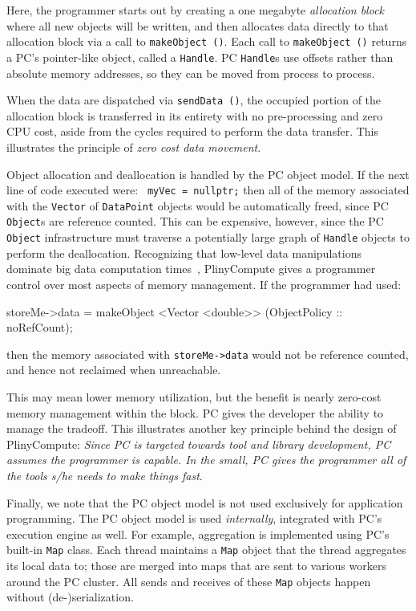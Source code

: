\noindent
Here, the programmer starts out by creating a one megabyte \emph{allocation block} where all new objects will be written,
and then allocates data directly to that allocation block via a call to \texttt{makeObject ()}.  Each call to  \texttt{makeObject ()}
returns a PC's pointer-like object, called a \texttt{Handle}.  PC \texttt{Handle}s use offsets rather than absolute memory
addresses, so they can be moved from process to process.  

When the data are dispatched via \texttt{sendData ()},
the occupied
portion of the allocation block is transferred in its entirety with
no pre-processing and zero CPU cost, aside from the cycles required to perform the data transfer.  
This illustrates the principle of \emph{zero cost data movement}.

Object allocation and deallocation 
is handled by the PC object model.
If the next line of code executed were:
\texttt{
myVec = nullptr;}
then all of the memory associated with the \texttt{Vector} of \texttt{DataPoint} objects would be automatically
freed, since PC \texttt{Object}s are reference counted.  This can
be expensive, however, since the PC \texttt{Object} infrastructure must traverse a potentially large graph of \texttt{Handle} objects to perform the deallocation.  
Recognizing that low-level data manipulations dominate big data
computation times~\cite{ousterhout2015making, shi2015clash}, PlinyCompute gives a programmer control
over most aspects of memory management. If the 
programmer had used: 

\begin{codesmall}
storeMe->data = makeObject <Vector <double>>
     (ObjectPolicy :: noRefCount);
\end{codesmall}


\noindent then the memory associated with \texttt{storeMe->data} would
not be reference counted, and hence not reclaimed when unreachable.  

This may mean lower memory utilization,
but the benefit is nearly zero-cost memory management within the block.
PC gives the developer the ability to manage the tradeoff.
This illustrates another key principle behind the design of
PlinyCompute: \emph{Since PC is targeted towards tool and library
  development, PC assumes the programmer is capable.  In
  the small, PC gives the programmer all of the tools s/he needs to make things fast}.

Finally, we note that the PC object model is not used exclusively 
for application programming.  The PC object model
is used \emph{internally}, integrated with PC's execution engine as well.
For example, aggregation is implemented using PC's built-in
\texttt{Map} class.  Each thread maintains
a \texttt{Map} object that the thread aggregates its local data to; those are
merged into maps that are sent to various workers around the PC
cluster.  All sends and receives of these \texttt{Map} objects happen
without (de-)serialization.

